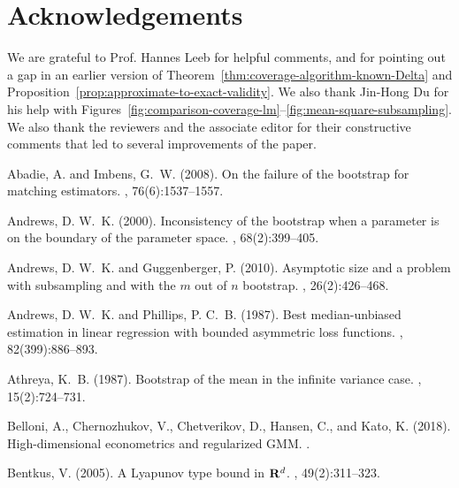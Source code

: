\documentclass{article}
\numberwithin{myalgctr}{section}
\begin{document}
\section*{Acknowledgements}
We are grateful to Prof. Hannes Leeb for helpful comments, and for pointing out a gap in an earlier version of Theorem~\ref{thm:coverage-algorithm-known-Delta} and Proposition~\ref{prop:approximate-to-exact-validity}. We also thank Jin-Hong Du for his help with Figures~\ref{fig:comparison-coverage-lm}--\ref{fig:mean-square-subsampling}. We also thank the reviewers and the associate editor for their constructive comments that led to several improvements of the paper.
\begin{thebibliography}{}

Abadie, A. and Imbens, G.~W. (2008).
\newblock On the failure of the bootstrap for matching estimators.
, 76(6):1537--1557.

Andrews, D. W.~K. (2000).
\newblock Inconsistency of the bootstrap when a parameter is on the boundary of
  the parameter space.
, 68(2):399--405.

Andrews, D. W.~K. and Guggenberger, P. (2010).
\newblock Asymptotic size and a problem with subsampling and with the {$m$} out
  of {$n$} bootstrap.
, 26(2):426--468.

Andrews, D. W.~K. and Phillips, P. C.~B. (1987).
\newblock Best median-unbiased estimation in linear regression with bounded
  asymmetric loss functions.
, 82(399):886--893.

Athreya, K.~B. (1987).
\newblock Bootstrap of the mean in the infinite variance case.
, 15(2):724--731.

Belloni, A., Chernozhukov, V., Chetverikov, D., Hansen, C., and Kato, K.
  (2018).
\newblock High-dimensional econometrics and regularized {GMM}.
.

Bentkus, V. (2005).
\newblock A {L}yapunov type bound in {${\bf R}^d$}.
, 49(2):311--323.


\end{thebibliography}
\end{document}
